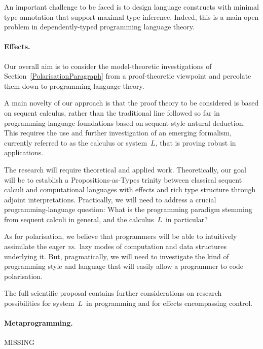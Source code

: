 \documentclass[11pt,twocolumn]{article}
\newcommand{\hl}[1]{#1}%
\newcommand{\vs}{\emph{vs.}}
\newcommand{\SysL}{$L$}%
\begin{document}
An important \hl{challenge} to be faced is to design language constructs
with minimal type annotation that support maximal type inference.  Indeed,
this is a main open problem in dependently-typed programming language theory.

\paragraph{Effects.}
\label{ProgrammingEffectsParagraph}

Our overall \hl{aim} is to consider the model-theoretic investigations of
Section~\ref{PolarisationParagraph} from a proof-theoretic viewpoint and
percolate them down to programming language theory.

A main \hl{novelty} of our approach is that the proof theory to be
considered is based on sequent calculus, rather than the traditional line
followed so far in programming-language foundations based on sequent-style
natural deduction.  This requires the use and further investigation of an
emerging formalism, currently referred to as the calculus or system~\SysL,
that is proving robust in applications.

The research will require theoretical and applied work.  Theoretically, our
\hl{goal} will be to establish a Propositions-as-Types trinity between
classical sequent calculi and computational languages with effects and rich
type structure through adjoint interpretations.  Practically, we will need to
address a crucial programming-language \hl{question}:  What is the
programming paradigm stemming from sequent calculi in general, and the
calculus~\SysL\ in particular? 

As for polarisation, we believe that programmers will be able to intuitively
assimilate the eager {\vs}~lazy modes of computation and data structures
underlying it.  But, pragmatically, we will need to \hl{investigate} the
kind of programming style and language that will easily allow a programmer to
code polarisation.

The full scientific proposal contains further considerations on \hl{research}
possibilities for system~\SysL\ in programming and for effects encompassing
control.

\paragraph{Metaprogramming.}
\label{MetaprogrammingParagraph}

\mbox{}\newline
{\color{red}MISSING}
\end{document}
